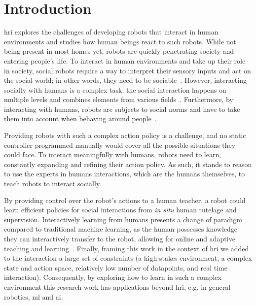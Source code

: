 \chapter{Introduction} \label{chap:intro}
\graphicspath{{images/intro/}}
\glsresetall


\gls{hri} explores the challenges of developing robots that interact in human environments and studies how human beings react to such robots. While not being present in most homes yet, robots are quickly penetrating society and entering people's life. %
To interact in human environments and take up their role in society, social robots require a way to interpret their sensory inputs and act on the social world; in other words, they need to be sociable~\citep{breazeal2004designing}. However, interacting socially with humans is a complex task: the social interaction happens on multiple levels and combines elements from various fields~\citep{fong2003survey}. Furthermore, by interacting with humans, robots are subjects to social norms and have to take them into account when behaving around people~\citep{bartneck2004design}. 

Providing robots with such a complex action policy is a challenge, and no static controller programmed manually would cover all the possible situations they could face. To interact meaningfully with humans, robots need to learn, constantly expanding and refining their action policy. As such, it stands to reason to use the experts in humans interactions, which are the humans themselves, to teach robots to interact socially. 

By providing control over the robot's actions to a human teacher, a robot could learn efficient policies for social interactions from \textit{in situ} human tutelage and supervision. Interactively learning from humans presents a change of paradigm compared to traditional machine learning, as the human possesses knowledge they can interactively transfer to the robot, allowing for online and adaptive teaching and learning~\citep{fails2003interactive,amershi2014power}. Finally, framing this work in the context of \gls{hri} we added to the interaction a large set of constraints (a high-stakes environment, a complex state and action space, relatively low number of datapoints, and real time interaction). Consequently, by exploring how to learn in such a complex environment this research work has applications beyond \gls{hri}, e.g. in general robotics, \gls{ml} and \gls{ai}.

